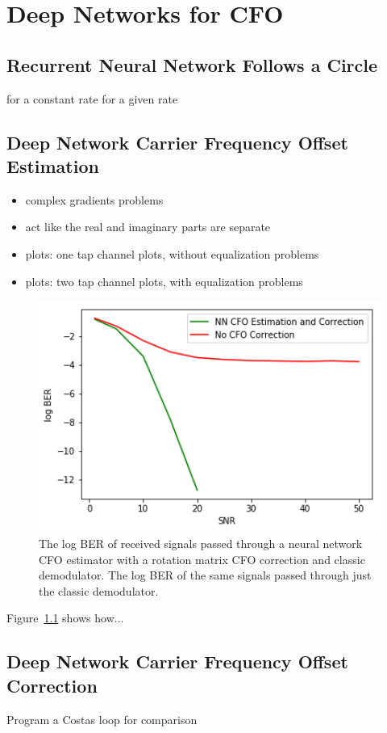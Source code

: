\chapter{Deep Networks for CFO}

\section{Recurrent Neural Network Follows a Circle}
for a constant rate
for a given rate


\section{Deep Network Carrier Frequency Offset Estimation}
\begin{itemize}
\item complex gradients problems
\item act like the real and imaginary parts are separate
\item plots: one tap channel plots, without equalization problems
\item plots: two tap channel plots, with equalization problems
\end{itemize}


\begin{figure}
\begin{center}
\includegraphics[width=14cm]{figures/cfo_estimation.png}
\caption{The log BER of received signals passed through a neural network CFO estimator with a rotation matrix CFO correction and classic demodulator. The log BER of the same signals passed through just the classic demodulator.}
\label{fig:cfo_est}
\end{center}
\end{figure}

Figure~\ref{fig:cfo_est} shows how...

\section{Deep Network Carrier Frequency Offset Correction}
Program a Costas loop for comparison 